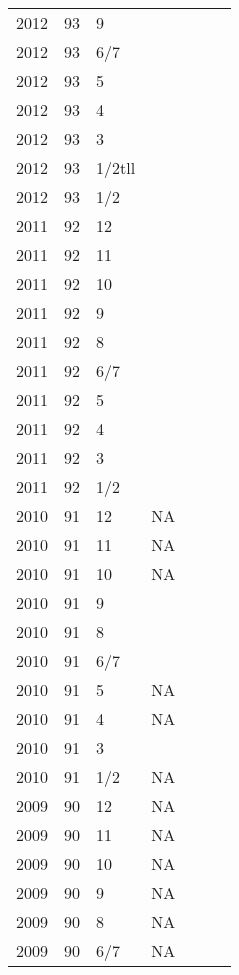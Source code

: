 \begin{longtable}{ |l|l|l|l|p{2.7cm}|l|p{2cm}| }
 2012 & 93 & 9     &         &  &  & \\
 2012 & 93 &   6/7 &         &  &  & \\
 2012 & 93 &     5 &         &  &  & \\
 2012 & 93 &     4 &         &  &  & \\
 2012 & 93 &     3 &         &  &  & \\
 2012 & 93 & 1/2tll&         &  &  & \\
 2012 & 93 &   1/2 &         &  &  & \\
 2011 & 92 &    12 &         &  &  & \\
 2011 & 92 &    11 &         &  &  & \\
 2011 & 92 &    10 &         &  &  & \\
 2011 & 92 &     9 &         &  &  & \\
 2011 & 92 &     8 &         &  &  & \\
 2011 & 92 &   6/7 &         &  &  & \\
 2011 & 92 &     5 &         &  &  & \\
 2011 & 92 &     4 &         &  &  & \\
 2011 & 92 &     3 &         &  &  & \\
 2011 & 92 &   1/2 &         &  &  & \\
 2010 & 91 &   12  &      NA &  &  & \\
 2010 & 91 &    11 &      NA &  &  & \\
 2010 & 91 &    10 &      NA &  &  & \\
 2010 & 91 &     9 &         &  &  & \\
 2010 & 91 &     8 &         &  &  & \\
 2010 & 91 &   6/7 &         &  &  & \\
 2010 & 91 &     5 &     NA  &  &  & \\
 2010 & 91 &     4 &     NA  &  &  & \\
 2010 & 91 &     3 &         &  &  & \\
 2010 & 91 &   1/2 &      NA &  &  & \\
 2009 & 90 &    12 &      NA &  &  & \\
 2009 & 90 &    11 &      NA &  &  & \\
 2009 & 90 &    10 &      NA &  &  & \\
 2009 & 90 &     9 &      NA &  &  & \\
 2009 & 90 &     8 &      NA &  &  & \\
 2009 & 90 &   6/7 &      NA &  &  & \\

\end{longtable}
